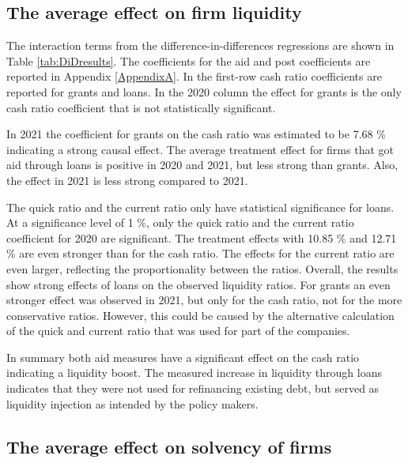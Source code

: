 \subsection{The average effect on firm liquidity}



The interaction terms from the difference-in-differences regressions are shown in Table \ref{tab:DiDresults}. 
The coefficients for the aid and post coefficients are reported in Appendix \ref{AppendixA}. In the first-row cash ratio coefficients are reported for grants and loans. In the 2020 column the effect for grants is the only cash ratio coefficient that is not statistically significant. 

In 2021 the coefficient for grants on the cash ratio was estimated to be 7.68 \% indicating a strong causal effect. The average treatment effect for firms that got aid through loans is positive in 2020 and 2021, but less strong than grants. Also, the effect in 2021 is less strong compared to 2021.

The quick ratio and the current ratio only have statistical significance for loans. At a significance level of 1 \%, only the quick ratio and the current ratio coefficient for 2020 are significant. The treatment effects with 10.85 \% and 12.71 \% are even stronger than for the cash ratio. The effects for the current ratio are even larger, reflecting the proportionality between the ratios. Overall, the results show strong effects of loans on the observed liquidity ratios. For grants an even stronger effect was observed in 2021, but only for the cash ratio, not for the more conservative ratios. However, this could be caused by the alternative calculation of the quick and current ratio that was used for part of the companies. 

In summary both aid measures have a significant effect on the cash ratio indicating a liquidity boost. The measured increase in liquidity through loans indicates that they were not used for refinancing existing debt, but served as liquidity injection as intended by the policy makers.

\subsection{The average effect on solvency of firms}

